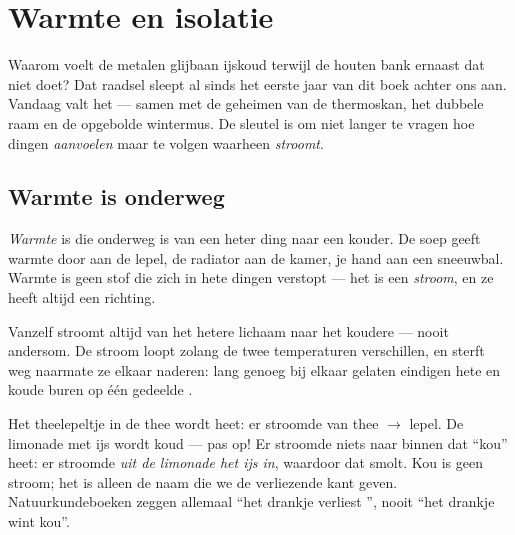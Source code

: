 \chapter{Warmte en isolatie}\label{ch:g5:heat-and-insulation}

Waarom voelt de metalen glijbaan ijskoud terwijl de houten bank ernaast
dat niet doet? Dat raadsel sleept al sinds het eerste jaar van dit boek
achter ons aan. Vandaag valt het --- samen met de geheimen van de
thermoskan, het dubbele raam en de opgebolde wintermus. De sleutel is
om niet langer te vragen hoe dingen \emph{aanvoelen} maar te volgen
waarheen  \emph{stroomt}.

\section{Warmte is onderweg}

\begin{definition}[Warmte]\label{def:g5:heat-and-insulation:heat}
\emph{Warmte} is  die onderweg is van een heter
ding naar een kouder. De soep geeft warmte door aan de lepel, de
radiator aan de kamer, je hand aan een sneeuwbal. Warmte is geen stof
die zich in hete dingen verstopt --- het is een \emph{stroom}, en ze
heeft altijd een richting.
\end{definition}

\begin{proposition}\label{prop:g5:heat-and-insulation:downhill}
Vanzelf stroomt  altijd van het hetere lichaam naar het koudere
--- nooit andersom. De stroom loopt zolang de twee
temperaturen verschillen, en sterft weg naarmate ze elkaar naderen:
lang genoeg bij elkaar gelaten eindigen hete en koude buren op één
gedeelde .
\end{proposition}

\begin{example}\label{ex:g5:heat-and-insulation:direction}
Het theelepeltje in de thee wordt heet: er stroomde  van thee
$\to$ lepel. De limonade met ijs wordt koud --- pas op! Er stroomde
niets naar binnen dat ``kou'' heet: er stroomde  \emph{uit de
limonade het ijs in}, waardoor dat smolt. Kou is geen stroom; het is
alleen de naam die we de verliezende kant geven. Natuurkundeboeken
zeggen allemaal ``het drankje verliest '', nooit ``het drankje
wint kou''.
\end{example}

